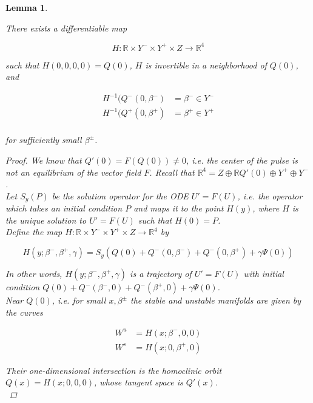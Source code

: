 \documentclass[12pt]{article}
\def\R{{\mathbb R}}
\newtheorem{lemma}{Lemma}
\begin{document}
\begin{lemma}\label{straightenW}

There exists a differentiable map 

\[
H: \R \times Y^- \times Y^+ \times Z \rightarrow \R^4
\]

such that $H(0, 0, 0, 0) = Q(0)$, $H$ is invertible in a neighborhood of $Q(0)$, and

\begin{align*}
H^{-1}(Q^-(0, \beta^-) &= \beta^- \in Y^- \\
H^{-1}(Q^+(0, \beta^+) &= \beta^+ \in Y^+ \\
\end{align*}

for sufficiently small $\beta^\pm$.

\begin{proof}
We know that $Q'(0) = F(Q(0)) \neq 0$, i.e. the center of the pulse is not an equilibrium of the vector field $F$. Recall that $\R^4 = Z \oplus \R Q'(0) \oplus Y^+ \oplus Y^-$.\\

Let $S_y(P)$ be the solution operator for the ODE $U' = F(U)$, i.e. the operator which takes an initial condition $P$ and maps it to the point $H(y)$, where $H$ is the unique solution to $U' = F(U)$ such that $H(0) = P$.\\

Define the map $H: \R \times Y^- \times Y^+ \times Z \rightarrow \R^4$ by 

\begin{equation}
H(y; \beta^-, \beta^+, \gamma) = S_y(Q(0) + Q^-(0, \beta^-) + Q^-(0, \beta^+) + \gamma \Psi(0))
\end{equation}

In other words, $H(y; \beta^-, \beta^+, \gamma)$ is a trajectory of $U' = F(U)$ with initial condition $Q(0) + Q^-(\beta^-,0) + Q^-(\beta^+,0) + \gamma \Psi(0)$.\\ 

Near $Q(0)$, i.e. for small $x, \beta^\pm$ the stable and unstable manifolds are given by the curves

\begin{align*}
W^u &= H(x; \beta^-, 0, 0) \\
W^s &= H(x; 0, \beta^+, 0) 
\end{align*}

Their one-dimensional intersection is the homoclinic orbit $Q(x) = H(x; 0, 0, 0)$, whose tangent space is $Q'(x)$.\\


\end{proof}
\end{lemma}
\end{document}
